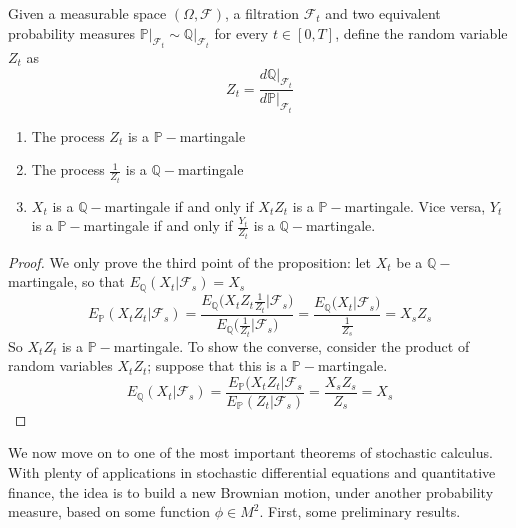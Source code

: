 \begin{proposition}
    Given a measurable space $(\Omega,\mathcal{F})$, a filtration $\mathcal{F}_t$ and two equivalent probability measures $\mathbb{P}\vert_{\mathcal{F}_t} \sim \mathbb{Q}\vert_{\mathcal{F}_t}$ for every $t \in [0,T]$, define the random variable $Z_t$ as
    \begin{equation*}
        Z_t = \frac{d\mathbb{Q}\vert_{\mathcal{F}_t}}{d\mathbb{P}\vert_{\mathcal{F}_t}}
    \end{equation*}
    \begin{enumerate}
        \item The process $Z_t$ is a $\mathbb{P}-$martingale 
        \item The process $\frac{1}{Z_t}$ is a $\mathbb{Q}-$martingale
        \item $X_t$ is a $\mathbb{Q}-$martingale if and only if $X_tZ_t$ is a $\mathbb{P}-$martingale. Vice versa, $Y_t$ is a $\mathbb{P}-$martingale if and only if $\frac{Y_t}{Z_t}$ is a $\mathbb{Q}-$martingale.
    \end{enumerate}
\end{proposition}
\begin{proof}
    We only prove the third point of the proposition: let $X_t$ be a $\mathbb{Q}-$martingale, so that $E_{\mathbb{Q}}(X_t \vert \mathcal{F}_s) = X_s$
    \begin{equation*}
        E_{\mathbb{P}}(X_t Z_t \vert \mathcal{F}_s) = \frac{E_{\mathbb{Q}}\Big( X_t Z_t \frac{1}{Z_t} \Big\vert \mathcal{F}_s\Big)}{E_{\mathbb{Q}}\Big( \frac{1}{Z_t}\Big\vert \mathcal{F}_s\Big)} = \frac{E_{\mathbb{Q}}\big( X_t \vert \mathcal{F}_s \big)}{\frac{1}{Z_s}} = X_sZ_s
    \end{equation*}
    So $X_t Z_t$ is a $\mathbb{P}-$martingale. To show the converse, consider the product of random variables $X_t Z_t$; suppose that this is a $\mathbb{P}-$martingale.
    \begin{equation*}
        E_{\mathbb{Q}}(X_t \vert \mathcal{F}_s) = \frac{E_{\mathbb{P}}(X_t Z_t \vert \mathcal{F}_s}{E_{\mathbb{P}}(Z_t \vert \mathcal{F}_s)} = \frac{X_s Z_s}{Z_s} = X_s
     \end{equation*}
\end{proof}

We now move on to one of the most important theorems of stochastic calculus. With plenty of applications in stochastic differential equations and quantitative finance, the idea is to build a new Brownian motion, under another probability measure, based on some function $\phi \in M^2$. First, some preliminary results.

